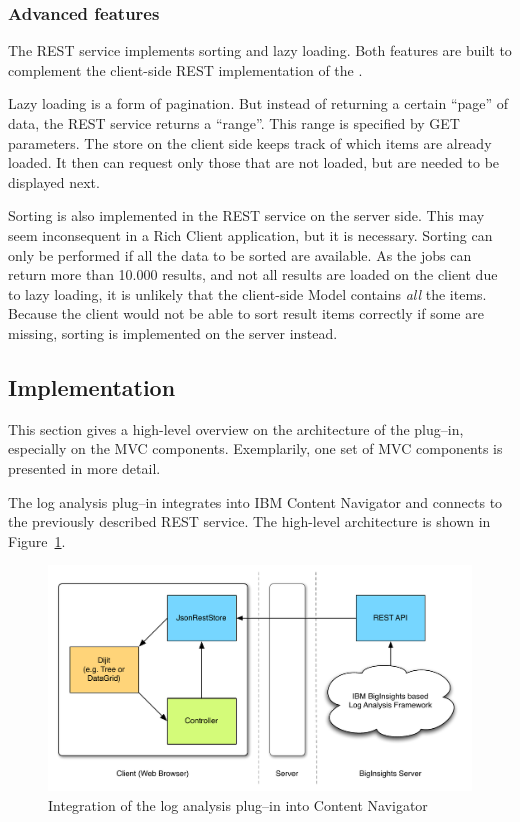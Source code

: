 \subsubsection{Advanced features}
The REST service implements sorting and lazy loading. Both features are built to complement the client-side REST implementation of the .

Lazy loading is a form of pagination. But instead of returning a certain ``page'' of data, the REST service returns a ``range''. This range is specified by GET parameters. The store on the client side keeps track of which items are already loaded. It then can request only those that are not loaded, but are needed to be displayed next.

Sorting is also implemented in the REST service on the server side. This may seem inconsequent in a Rich Client application, but it is necessary. Sorting can only be performed if all the data to be sorted are available. As the jobs can return more than 10.000 results, and not all results are loaded on the client due to lazy loading, it is unlikely that the client-side Model contains \emph{all} the items. Because the client would not be able to sort result items correctly if some are missing, sorting is implemented on the server instead.

\subsection{Implementation}
\label{sec:plugindesign}
This section gives a high-level overview on the architecture of the plug--in, especially on the MVC components. Exemplarily, one set of MVC components is presented in more detail.

The log analysis plug--in integrates into IBM Content Navigator and connects to the previously described REST service. The high-level architecture is shown in Figure~\ref{fig:loganalarch}.

\begin{figure}[H]
	\centering
	\includegraphics[width=14cm]{images/loganalarch.pdf}
	\caption{Integration of the log analysis plug--in into Content Navigator}
	\label{fig:loganalarch}
\end{figure}

